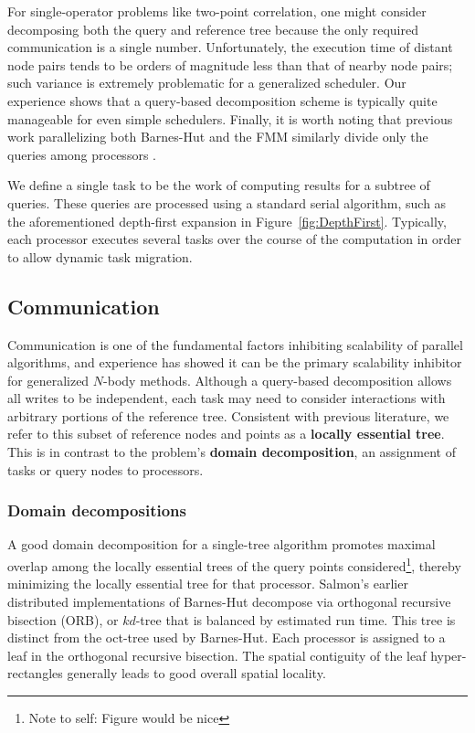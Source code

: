 \documentclass[twoside,leqno,twocolumn]{article}
\newcommand{\authornote}[1]{\footnote{Note to self: #1}}
\newcommand{\authorsnote}[1]{\authornote{#1}}
\newcommand{\fig}[1]{Figure~\ref{fig:#1}}
\newcommand{\mysubsub}[1]{\subsubsection{#1} }
\newcommand{\defterm}[1]{{\bf #1}}
\begin{document}
For single-operator problems like two-point correlation, one might consider decomposing both the query and reference tree because the only required communication is a single number.
Unfortunately, the execution time of distant node pairs tends to be orders of magnitude less than that of nearby node pairs; such variance is extremely problematic for a generalized scheduler.
Our experience shows that a query-based decomposition scheme is typically quite manageable for even simple schedulers.
Finally, it is worth noting that previous work parallelizing both Barnes-Hut and the FMM similarly divide only the queries among processors \cite{salmon_thesis, singh_thesis, liu94experiences}.

We define a single task to be the work of computing results for a subtree of queries.
These queries are processed using a standard serial algorithm, such as the aforementioned depth-first expansion in \fig{DepthFirst}.
Typically, each processor executes several tasks over the course of the computation in order to allow dynamic task migration.

\subsection{Communication}

Communication is one of the fundamental factors inhibiting scalability of parallel algorithms, and experience has showed it can be the primary scalability inhibitor for generalized $N$-body methods.
Although a query-based decomposition allows all writes to be independent, each task may need to consider interactions with arbitrary portions of the reference tree.
Consistent with previous literature\cite{salmon_thesis, singh_thesis}, we refer to this subset of reference nodes and points as a \defterm{locally essential tree}.
This is in contrast to the problem's \defterm{domain decomposition}, an assignment of tasks or query nodes to processors.

\mysubsub{Domain decompositions}
A good domain decomposition for a single-tree algorithm promotes maximal overlap among the locally essential trees of the query points considered\authorsnote{Figure would be nice}, thereby minimizing the locally essential tree for that processor.
Salmon's earlier distributed implementations of Barnes-Hut \cite{salmon_thesis} decompose via orthogonal recursive bisection (ORB), or $kd$-tree that is balanced by estimated run time.
This tree is distinct from the oct-tree used by Barnes-Hut.
Each processor is assigned to a leaf in the orthogonal recursive bisection.
The spatial contiguity of the leaf hyper-rectangles generally leads to good overall spatial locality.
\end{document}
